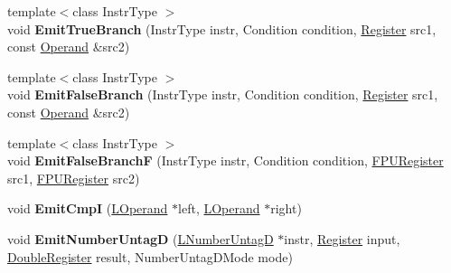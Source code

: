 \begin{DoxyCompactItemize}
\item 
{\footnotesize template$<$class Instr\+Type $>$ }\\void {\bfseries Emit\+True\+Branch} (Instr\+Type instr, Condition condition, \hyperlink{structv8_1_1internal_1_1_register}{Register} src1, const \hyperlink{classv8_1_1internal_1_1_operand}{Operand} \&src2)\hypertarget{classv8_1_1internal_1_1_l_code_gen_ab2fd64035fa0633a32c4b2b5a02e574c}{}\label{classv8_1_1internal_1_1_l_code_gen_ab2fd64035fa0633a32c4b2b5a02e574c}

\item 
{\footnotesize template$<$class Instr\+Type $>$ }\\void {\bfseries Emit\+False\+Branch} (Instr\+Type instr, Condition condition, \hyperlink{structv8_1_1internal_1_1_register}{Register} src1, const \hyperlink{classv8_1_1internal_1_1_operand}{Operand} \&src2)\hypertarget{classv8_1_1internal_1_1_l_code_gen_a32a537c6acd71f81aaf9003450fbb280}{}\label{classv8_1_1internal_1_1_l_code_gen_a32a537c6acd71f81aaf9003450fbb280}

\item 
{\footnotesize template$<$class Instr\+Type $>$ }\\void {\bfseries Emit\+False\+BranchF} (Instr\+Type instr, Condition condition, \hyperlink{structv8_1_1internal_1_1_double_register}{F\+P\+U\+Register} src1, \hyperlink{structv8_1_1internal_1_1_double_register}{F\+P\+U\+Register} src2)\hypertarget{classv8_1_1internal_1_1_l_code_gen_a4f258e0f91fc915ba419271f477fa080}{}\label{classv8_1_1internal_1_1_l_code_gen_a4f258e0f91fc915ba419271f477fa080}

\item 
void {\bfseries Emit\+CmpI} (\hyperlink{classv8_1_1internal_1_1_l_operand}{L\+Operand} $\ast$left, \hyperlink{classv8_1_1internal_1_1_l_operand}{L\+Operand} $\ast$right)\hypertarget{classv8_1_1internal_1_1_l_code_gen_acf842065a54732189712be561bf934b3}{}\label{classv8_1_1internal_1_1_l_code_gen_acf842065a54732189712be561bf934b3}

\item 
void {\bfseries Emit\+Number\+UntagD} (\hyperlink{classv8_1_1internal_1_1_l_number_untag_d}{L\+Number\+UntagD} $\ast$instr, \hyperlink{structv8_1_1internal_1_1_register}{Register} input, \hyperlink{structv8_1_1internal_1_1_double_register}{Double\+Register} result, Number\+Untag\+D\+Mode mode)\hypertarget{classv8_1_1internal_1_1_l_code_gen_afe9da04662b57d40a181108571021c8c}{}\label{classv8_1_1internal_1_1_l_code_gen_afe9da04662b57d40a181108571021c8c}


\end{DoxyCompactItemize}
